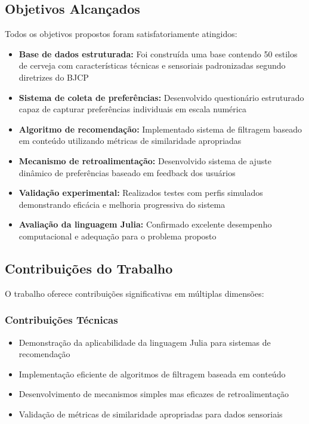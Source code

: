 \documentclass[12pt,a4paper]{article}
\begin{document}
\subsection{Objetivos Alcançados}

Todos os objetivos propostos foram satisfatoriamente atingidos:

\begin{itemize}
\item \textbf{Base de dados estruturada:} Foi construída uma base contendo 50 estilos de cerveja com características técnicas e sensoriais padronizadas segundo diretrizes do BJCP
\item \textbf{Sistema de coleta de preferências:} Desenvolvido questionário estruturado capaz de capturar preferências individuais em escala numérica
\item \textbf{Algoritmo de recomendação:} Implementado sistema de filtragem baseado em conteúdo utilizando métricas de similaridade apropriadas
\item \textbf{Mecanismo de retroalimentação:} Desenvolvido sistema de ajuste dinâmico de preferências baseado em feedback dos usuários
\item \textbf{Validação experimental:} Realizados testes com perfis simulados demonstrando eficácia e melhoria progressiva do sistema
\item \textbf{Avaliação da linguagem Julia:} Confirmado excelente desempenho computacional e adequação para o problema proposto
\end{itemize}

\subsection{Contribuições do Trabalho}

O trabalho oferece contribuições significativas em múltiplas dimensões:

\subsubsection{Contribuições Técnicas}

\begin{itemize}
\item Demonstração da aplicabilidade da linguagem Julia para sistemas de recomendação
\item Implementação eficiente de algoritmos de filtragem baseada em conteúdo
\item Desenvolvimento de mecanismos simples mas eficazes de retroalimentação
\item Validação de métricas de similaridade apropriadas para dados sensoriais
\end{itemize}
\end{document}
